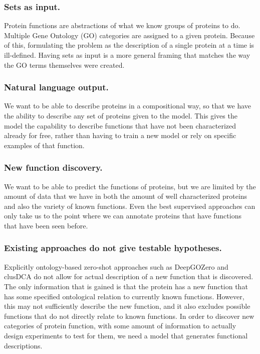\documentclass{article}
\begin{document}
        \subsubsection{Sets as input.}
        Protein functions are abstractions of what we know groups of proteins to do. Multiple Gene Ontology (GO) categories are assigned to a given protein\citet{GO}. Because of this, formulating the problem as the description of a single protein at a time is ill-defined. Having sets as input is a more general framing that matches the way the GO terms themselves were created. %
        \subsubsection{Natural language output.}
            We want to be able to describe proteins in a compositional way, so that we have the ability to describe any set of proteins given to the model. This gives the model the capability to describe functions that have not been characterized already for free, rather than having to train a new model or rely on specific examples of that function.
        \subsubsection{New function discovery.}
            We want to be able to predict the functions of proteins, but we are limited by the amount of data that we have in both the amount of well characterized proteins and also the variety of known functions. Even the best supervised approaches can only take us to the point where we can annotate proteins that have functions that have been seen before.
        \subsubsection{Existing approaches do not give testable hypotheses.}
        Explicitly ontology-based zero-shot approaches such as DeepGOZero \citet{DeepGOZero} and clusDCA \cite{clusDCA} do not allow for actual description of a new function that is discovered.
            The only information that is gained is that the protein has a new function that has some specified ontological relation to currently known functions.
            However, this may not sufficiently describe the new function, and it also excludes possible functions that do not directly relate to known functions.
            In order to discover new categories of protein function, with some amount of information to actually design experiments to test for them, we need a model that generates functional descriptions.
\end{document}
